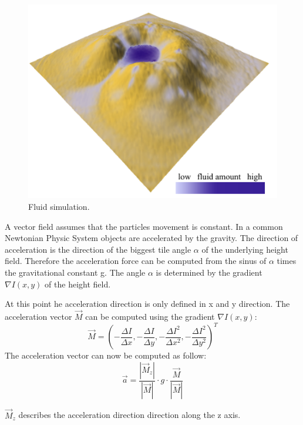 \begin{figure}
	\centering
	\includegraphics[width=\linewidth]{NWD05/hydraulic_errosion_b}
	\caption{Fluid simulation.}
	\label{fig:calc_acceleration}
\end{figure}

A vector field assumes that the particles movement is constant. In a common Newtonian Physic System objects are accelerated by the gravity. The direction of acceleration is the direction of the biggest tile angle $\alpha$ of the underlying height field. Therefore the acceleration force can be computed from the sinus of $\alpha$ times the gravitational constant g. The angle $\alpha$ is determined by the gradient $\nabla I(x,y)$ of the height field. 

At this point he acceleration direction is only defined in x and y direction. The acceleration vector $\vec{M}$ can be computed using the gradient $\nabla I(x,y)$: 
$$\vec{M} = (- \frac{\Delta I}{\Delta x}, - \frac{\Delta I}{\Delta y}, - \frac{\Delta I^2}{\Delta x^2}, - \frac{\Delta I^2}{\Delta y^2})^T$$
The acceleration vector can now be computed as follow: 
$$\vec{a}= \frac{|\vec{M}_z|}{|\vec{M}|} \cdot g \cdot \frac{\vec{M}}{|\vec{M}|}$$

$\vec{M}_z$ describes the acceleration direction direction along the z axis.

